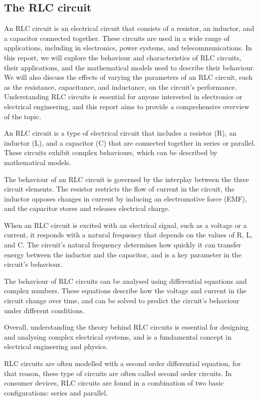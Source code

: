 \documentclass[12pt,twoside]{extarticle}
\begin{document}
\subsection{The RLC circuit}
\noindent An RLC circuit is an electrical circuit that consists of a resistor, an inductor, and a capacitor connected together. These circuits are used in a wide range of applications, including in electronics, power systems, and telecommunications. In this report, we will explore the behaviour and characteristics of RLC circuits, their applications, and the mathematical models used to describe their behaviour. We will also discuss the effects of varying the parameters of an RLC circuit, such as the resistance, capacitance, and inductance, on the circuit's performance. Understanding RLC circuits is essential for anyone interested in electronics or electrical engineering, and this report aims to provide a comprehensive overview of the topic.

An RLC circuit is a type of electrical circuit that includes a resistor (R), an inductor (L), and a capacitor (C) that are connected together in series or parallel. These circuits exhibit complex behaviours, which can be described by mathematical models.

The behaviour of an RLC circuit is governed by the interplay between the three circuit elements. The resistor restricts the flow of current in the circuit, the inductor opposes changes in current by inducing an electromotive force (EMF), and the capacitor stores and releases electrical charge.

When an RLC circuit is excited with an electrical signal, such as a voltage or a current, it responds with a natural frequency that depends on the values of R, L, and C. The circuit's natural frequency determines how quickly it can transfer energy between the inductor and the capacitor, and is a key parameter in the circuit's behaviour.

The behaviour of RLC circuits can be analysed using differential equations and complex numbers. These equations describe how the voltage and current in the circuit change over time, and can be solved to predict the circuit's behaviour under different conditions.

Overall, understanding the theory behind RLC circuits is essential for designing and analysing complex electrical systems, and is a fundamental concept in electrical engineering and physics.

RLC circuits are often modelled with a second order differential equation, for that reason, these type of circuits are often called second order circuits. In consumer devices, RLC circuits are found in a combination of two basic configurations: series and parallel. 
\end{document}
